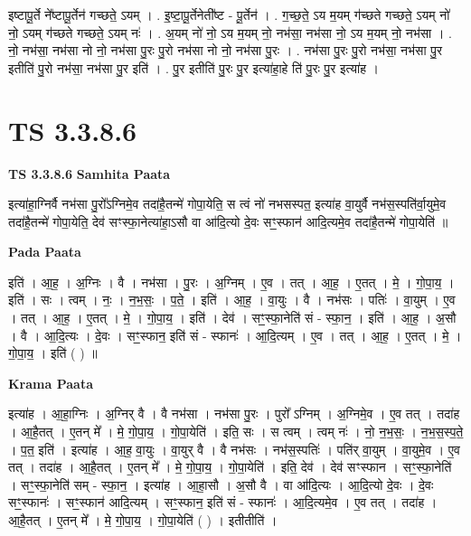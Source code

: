 \documentclass[17pt]{extarticle}
\begin{document}
इष्टापू॒र्ते ने᳚ष्टापू॒र्तेन॑ गच्छते॒ ऽयम् । . इ॒ष्टा॒पू॒र्तेनेती᳚ष्ट - पू॒र्तेन॑ । . ग॒च्छ॒ते॒ ऽय म॒यम् ग॑च्छते गच्छते॒ ऽयम् नो॑ नो॒ ऽयम् ग॑च्छते गच्छते॒ ऽयम् नः॑ । . अ॒यम् नो॑ नो॒ ऽय म॒यम् नो॒ नभ॑सा॒ नभ॑सा नो॒ ऽय म॒यम् नो॒ नभ॑सा । . नो॒ नभ॑सा॒ नभ॑सा नो नो॒ नभ॑सा पु॒रः पु॒रो नभ॑सा नो नो॒ नभ॑सा पु॒रः । . नभ॑सा पु॒रः पु॒रो नभ॑सा॒ नभ॑सा पु॒र इतीति॑ पु॒रो नभ॑सा॒ नभ॑सा पु॒र इति॑ । . पु॒र इतीति॑ पु॒रः पु॒र इत्या॑हा॒हे ति॑ पु॒रः पु॒र इत्या॑ह । \newline
\pagebreak
{}

\section{ TS 3.3.8.6 }

\textbf{TS 3.3.8.6 } \newline
\textbf{Samhita Paata} \newline

इत्या॑हा॒ग्निर्वै नभ॑सा पु॒रो᳚ऽग्निमे॒व तदा॑है॒तन्मे॑ गोपा॒येति॒ स त्वं नो॑ नभसस्पत॒ इत्या॑ह वा॒युर्वै नभ॑स॒स्पति॑र्वा॒युमे॒व तदा॑है॒तन्मे॑ गोपा॒येति॒ देव॑ सꣳस्फा॒नेत्या॑हा॒ऽसौ वा आ॑दि॒त्यो दे॒वः सꣳ॒॒स्फान॑ आदि॒त्यमे॒व तदा॑है॒तन्मे॑ गोपा॒येति॑ ॥ \newline

\textbf{Pada Paata} \newline

इति॑ । आ॒ह॒ । अ॒ग्निः । वै । नभ॑सा । पु॒रः । अ॒ग्निम् । ए॒व । तत् । आ॒ह॒ । ए॒तत् । मे॒ । गो॒पा॒य॒ । इति॑ । सः । त्वम् । नः॒ । न॒भ॒सः॒ । प॒ते॒ । इति॑ । आ॒ह॒ । वा॒युः । वै । नभ॑सः । पतिः॑ । वा॒युम् । ए॒व । तत् । आ॒ह॒ । ए॒तत् । मे॒ । गो॒पा॒य॒ । इति॑ । देव॑ । सꣳ॒॒स्फा॒नेति॑ सं - स्फा॒न॒ । इति॑ । आ॒ह॒ । अ॒सौ । वै । आ॒दि॒त्यः । दे॒वः । सꣳ॒॒स्फान॒ इति॑ सं - स्फानः॑ । आ॒दि॒त्यम् । ए॒व । तत् । आ॒ह॒ । ए॒तत् । मे॒ । गो॒पा॒य॒ । इति॑ ( ) ॥  \newline


\textbf{Krama Paata} \newline

इत्या॑ह । आ॒हा॒ग्निः । अ॒ग्निर् वै । वै नभ॑सा । नभ॑सा पु॒रः । पुरो᳚ ऽग्निम् । अ॒ग्निमे॒व । ए॒व तत् । तदा॑ह । आ॒है॒तत् । ए॒तन् मे᳚ । मे॒ गो॒पा॒य॒ । गो॒पा॒येति॑ । इति॒ सः । स त्वम् । त्वम् नः॑ । नो॒ न॒भ॒सः॒ । न॒भ॒स॒स्प॒ते॒ । प॒त॒ इति॑ । इत्या॑ह । आ॒ह॒ वा॒युः । वा॒युर् वै । वै नभ॑सः । नभ॑स॒स्पतिः॑ । पति॑र् वा॒युम् । वा॒युमे॒व । ए॒व तत् । तदा॑ह । आ॒है॒तत् । ए॒तन् मे᳚ । मे॒ गो॒पा॒य॒ । गो॒पा॒येति॑ । इति॒ देव॑ । देव॑ सꣳस्फान । सꣳ॒॒स्फा॒नेति॑ । सꣳ॒॒स्फा॒नेति॑ सम् - स्फा॒न॒ । इत्या॑ह । आ॒हा॒सौ । अ॒सौ वै । वा आ॑दि॒त्यः । आ॒दि॒त्यो दे॒वः । दे॒वः सꣳ॒॒स्फानः॑ । सꣳ॒॒स्फान॑ आदि॒त्यम् । सꣳ॒॒स्फान॒ इति॑ सं - स्फानः॑ । आ॒दि॒त्यमे॒व । ए॒व तत् । तदा॑ह । आ॒है॒तत् । ए॒तन् मे᳚ । मे॒ गो॒पा॒य॒ । गो॒पा॒येति॑ ( ) । इतीतीति॑ । \newline
\end{document}

